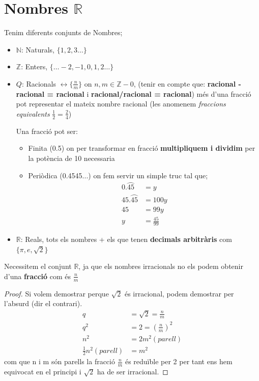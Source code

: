 \documentclass[12pt]{article}
\newcommand{\R}{\mathbb{R}}
\newcommand{\N}{\mathbb{N}}
\newcommand{\Z}{\mathbb{Z}}
\begin{document}
\tableofcontents

\newpage

\section{Nombres \texorpdfstring{$\R$}{R}}

Tenim diferents conjunts de Nombres;

\begin{itemize}
    \item $\N$: Naturals, $\{1,2,3 \dots\}$
    \item $\Z$: Enters, $\{\dots -2,-1,0,1,2 \dots\}$
    \item $Q$: Racionals $\leftrightarrow \{\frac{n}{m}\}$ on $n,m \in \Z - 0$, (tenir en compte que: \textbf{racional - racional = racional} i \textbf{racional/racional = racional}) més d'una fracció pot representar el mateix nombre racional (les anomenem \textit{fraccions equivalents} $\frac{1}{2} = \frac{2}{4}$)
    
    Una fracció pot ser:
    \begin{itemize}
        \item Finita (0.5) on per transformar en fracció \textbf{multipliquem i dividim} per la potència de 10 necessaria
        \item Periòdica (0.4545...) on fem servir un simple truc tal que;
        \begin{equation}
            \begin{aligned}
                0.\wideparen{45} &= y \\
                45.\wideparen{45} &= 100y\\
                45 &= 99y\\
                y &= \frac{45}{99}
            \end{aligned}
        \end{equation}
    \end{itemize}

    \item $\R$: Reals, tots els nombres + els que tenen \textbf{decimals arbitràris} com $\{\pi, e, \sqrt{2}\}$
\end{itemize}

Necessitem el conjunt $\R$, ja que els nombres irracionals no els podem obtenir d'una \textbf{fracció} com és $\frac{n}{m}$

\begin{proof}
    Si volem demostrar perque $\sqrt{2}$ és irracional, podem demostrar per l'absurd (dir el contrari).
    \begin{align*}
        q &= \sqrt{2} = \frac{n}{m} \\
        q^2 &= 2 = (\frac{n}{m})^2\\
        n^2 &= 2m^2 (parell)\\
        \frac{1}{2}n^2 (parell) &= m^2
    \end{align*}
    com que n i m són parells la fracció $\frac{n}{m}$ és reduïble per 2 per tant ens hem equivocat en el principi i $\sqrt{2}$ ha de ser irracional.
\end{proof}
\end{document}
